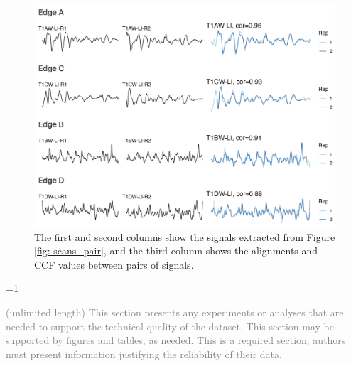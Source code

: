 \documentclass[fleqn,10pt]{wlscirep}
\newcommand{\ifinstruction}{1} %
\begin{document}
\begin{figure}[ht]
\centering
\includegraphics[width=0.8\linewidth]{signals_pair_alignment.png}
\caption{The first and second columns show the signals extracted from Figure \ref{fig: scans_pair}, and the third column shows the alignments and CCF values between pairs of signals.}
\label{fig: signals_pair_alignment}
\end{figure}

\ifnum \ifinstruction=1

\textcolor{gray}{(unlimited length) This section presents any experiments or analyses that are needed to support the technical quality of the dataset. This section may be supported by figures and tables, as needed. This is a required section; authors must present information justifying the reliability of their data.}
\end{document}
